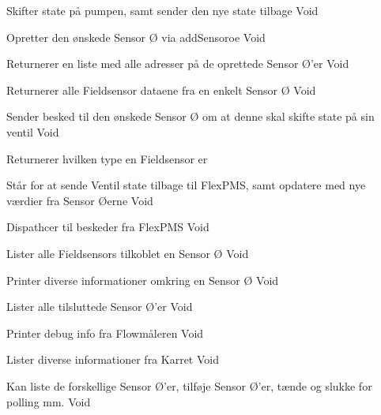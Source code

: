 {Skifter state på pumpen, samt sender den nye state tilbage}
{Void}
{
}

{Opretter den ønskede Sensor Ø via addSensoroe}
{Void}
{
}

{Returnerer en liste med alle adresser på de oprettede Sensor Ø'er}
{Void}
{
}

{Returnerer alle Fieldsensor dataene fra en enkelt Sensor Ø}
{Void}
{
}

{Sender besked til den ønskede Sensor Ø om at denne skal skifte state på sin ventil}
{Void}
{
}

{Returnerer hvilken type en Fieldsensor er}
{}
{
}

{Står for at sende Ventil state tilbage til FlexPMS, samt opdatere med nye værdier fra Sensor Øerne}
{Void}
{}

{Dispathcer til beskeder fra FlexPMS}
{Void}
{}

{Lister alle Fieldsensors tilkoblet en Sensor Ø}
{Void}
{
}

{Printer diverse informationer omkring en Sensor Ø}
{Void}
{
}

{Lister alle tilsluttede Sensor Ø'er}
{Void}
{}

{Printer debug info fra Flowmåleren}
{Void}
{}

{Lister diverse informationer fra Karret}
{Void}
{}

{Kan liste de forskellige Sensor Ø'er, tilføje Sensor Ø'er, tænde og slukke for polling mm.}
{Void}
{
}
